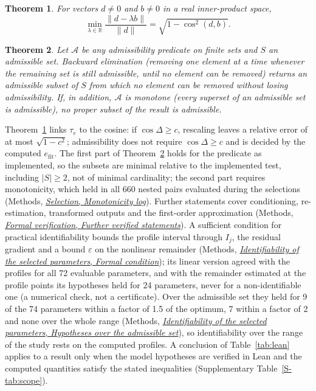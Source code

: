 \documentclass[pdflatex,sn-nature]{sn-jnl}
\theoremstyle{plain}
\newtheorem{theorem}{Theorem}
\newcommand{\mref}[2]{\hyperref[#1]{#2}}
\begin{document}
\begin{theorem}\label{thm:cos}
For vectors $d\neq 0$ and $b\neq 0$ in a real inner-product space,
\begin{equation*}
\min_{\lambda\in\mathbb{R}}\frac{\|d-\lambda b\|}{\|d\|} = \sqrt{1-\cos^2(d,b)}.
\end{equation*}
\end{theorem}

\begin{theorem}\label{thm:prune}
Let $\mathcal{A}$ be any admissibility predicate on finite sets and $S$ an admissible set. Backward elimination (removing one element at a time whenever the remaining set is still admissible, until no element can be removed) returns an admissible subset of $S$ from which no element can be removed without losing admissibility. If, in addition, $\mathcal{A}$ is monotone (every superset of an admissible set is admissible), no proper subset of the result is admissible.
\end{theorem}

Theorem~\ref{thm:cos} links $\tau_e$ to the cosine: if $\cos\Delta\ge c$, rescaling leaves a relative error of at most $\sqrt{1-c^2}$; admissibility does not require $\cos\Delta\ge c$ and is decided by the computed $e_{\mathrm{fit}}$. The first part of Theorem~\ref{thm:prune} holds for the predicate as implemented, so the subsets are minimal relative to the implemented test, including $|S|\ge2$, not of minimal cardinality; the second part requires monotonicity, which held in all 660 nested pairs evaluated during the selections (Methods, \mref{met:monotonicity}{\emph{Selection}, \emph{Monotonicity log}}). Further statements cover conditioning, re-estimation, transformed outputs and the first-order approximation (Methods, \mref{met:formal-further}{\emph{Formal verification}, \emph{Further verified statements}}). A sufficient condition for practical identifiability bounds the profile interval through $I_j$, the residual gradient and a bound $\varepsilon$ on the nonlinear remainder (Methods, \mref{met:identif-theorem}{\emph{Identifiability of the selected parameters}, \emph{Formal condition}}); its linear version agreed with the profiles for all 72 evaluable parameters, and with the remainder estimated at the profile points its hypotheses held for 24 parameters, never for a non-identifiable one (a numerical check, not a certificate). Over the admissible set they held for 9 of the 74 parameters within a factor of 1.5 of the optimum, 7 within a factor of 2 and none over the whole range (Methods, \mref{met:identif-region}{\emph{Identifiability of the selected parameters}, \emph{Hypotheses over the admissible set}}), so identifiability over the range of the study rests on the computed profiles. A conclusion of Table~\ref{tab:lean} applies to a result only when the model hypotheses are verified in Lean and the computed quantities satisfy the stated inequalities (Supplementary Table~\ref{S-tab:scope}).
\end{document}
